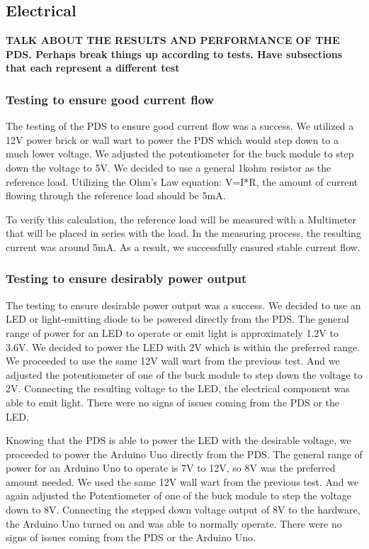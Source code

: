 \documentclass[conference]{IEEEtran}
\begin{document}
	\subsection{Electrical}
	\textbf{TALK ABOUT THE RESULTS AND PERFORMANCE OF THE PDS. Perhaps break things up according to tests. Have subsections that each represent a different test}
		\subsubsection{Testing to ensure good current flow}
		
		The testing of the PDS to ensure good current flow was a success. We utilized a 12V power brick or wall wart to power the PDS which would step down to a much lower voltage. We adjusted the potentiometer for the buck module to step down the voltage to 5V. We decided to use a general 1kohm resistor as the reference load. Utilizing the Ohm's Law equation: V=I*R, the amount of current flowing through the reference load should be 5mA.
		
		\indent To verify this calculation, the reference load will be measured with a Multimeter that will be placed in series with the load. In the measuring process, the resulting current was around 5mA. As a result, we successfully ensured stable current flow.
		
		\subsubsection{Testing to ensure desirably power output}
		The testing to ensure desirable power output was a success. We decided to use an LED or light-emitting diode to be powered directly from the PDS. The general range of power for an LED to operate or emit light is approximately 1.2V to 3.6V. We decided to power the LED with 2V which is within the preferred range. We proceeded to use the same 12V wall wart from the previous test. And we adjusted the potentiometer of one of the buck module to step down the voltage to 2V. Connecting the resulting voltage to the LED, the electrical component was able to emit light. There were no signs of issues coming from the PDS or the LED.
		
		\indent Knowing that the PDS is able to power the LED with the desirable voltage, we proceeded to power the Arduino Uno directly from the PDS. The general range of power for an Arduino Uno to operate is 7V to 12V, so 8V was the preferred amount needed. We used the same 12V wall wart from the previous test. And we again adjusted the Potentiometer of one of the buck module to step the voltage down to 8V. Connecting the stepped down voltage output of 8V to the hardware, the Arduino Uno turned on and was able to normally operate. There were no signs of issues coming from the PDS or the Arduino Uno.   
		
\end{document}
